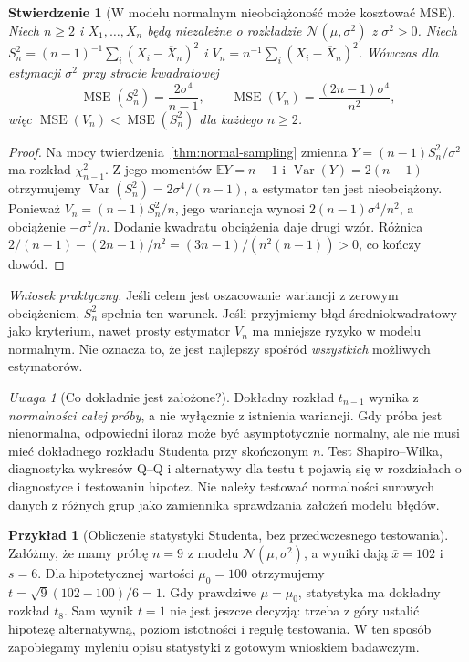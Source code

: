 \documentclass[11pt,a4paper,oneside]{report}
\numberwithin{equation}{chapter}
\theoremstyle{plain}
\newtheorem{stwierdzenie}[twierdzenie]{Stwierdzenie}
\theoremstyle{definition}
\newtheorem{przyklad}{Przykład}[chapter]
\theoremstyle{remark}
\newtheorem{uwaga}{Uwaga}[chapter]
\newcommand{\E}{\mathbb E}
\newcommand{\Var}{\operatorname{Var}}
\newcommand{\Normal}{\mathcal N}
\DeclareMathOperator{\MSE}{MSE}
\begin{document}
\begin{stwierdzenie}[W modelu normalnym nieobciążoność może kosztować MSE]
\label{prop:mse-samplevariance}
Niech $n\ge2$ i $X_1,\ldots,X_n$ będą niezależne o rozkładzie
$\Normal(\mu,\sigma^2)$ z $\sigma^2>0$. Niech
$S_n^2=(n-1)^{-1}\sum_i(X_i-\overline X_n)^2$ i
$V_n=n^{-1}\sum_i(X_i-\overline X_n)^2$.
Wówczas dla estymacji $\sigma^2$ przy stracie kwadratowej
\[
\MSE(S_n^2)=\frac{2\sigma^4}{n-1},\qquad
\MSE(V_n)=\frac{(2n-1)\sigma^4}{n^2},
\]
więc $\MSE(V_n)<\MSE(S_n^2)$ dla każdego $n\ge2$.
\end{stwierdzenie}
\begin{proof}
Na mocy twierdzenia~\ref{thm:normal-sampling} zmienna
$Y=(n-1)S_n^2/\sigma^2$ ma rozkład $\chi^2_{n-1}$.
Z jego momentów $\E Y=n-1$ i $\Var(Y)=2(n-1)$ otrzymujemy
$\Var(S_n^2)=2\sigma^4/(n-1)$, a estymator ten jest nieobciążony.
Ponieważ $V_n=(n-1)S_n^2/n$, jego wariancja wynosi
$2(n-1)\sigma^4/n^2$, a obciążenie $-\sigma^2/n$.
Dodanie kwadratu obciążenia daje drugi wzór.
Różnica \mbox{$2/(n-1)-(2n-1)/n^2=(3n-1)/(n^2(n-1))>0$},
co kończy dowód.
\end{proof}
\emph{Wniosek praktyczny.} Jeśli celem jest oszacowanie wariancji z
zerowym obciążeniem, $S_n^2$ spełnia ten warunek. Jeśli przyjmiemy
błąd średniokwadratowy jako kryterium, nawet prosty estymator
$V_n$ ma mniejsze ryzyko w modelu normalnym. Nie oznacza to, że
jest najlepszy spośród \emph{wszystkich} możliwych estymatorów.

\begin{uwaga}[Co dokładnie jest założone?]
Dokładny rozkład $t_{n-1}$ wynika z \emph{normalności całej próby}, a nie wyłącznie z istnienia wariancji. Gdy próba jest nienormalna, odpowiedni iloraz może być asymptotycznie normalny, ale nie musi mieć dokładnego rozkładu Studenta przy skończonym $n$. Test Shapiro--Wilka, diagnostyka wykresów Q--Q i alternatywy dla testu t pojawią się w rozdziałach o diagnostyce i testowaniu hipotez. Nie należy testować normalności surowych danych z różnych grup jako zamiennika sprawdzania założeń modelu błędów.
\end{uwaga}

\begin{przyklad}[Obliczenie statystyki Studenta, bez przedwczesnego testowania]\label{ex:t-demo}
Załóżmy, że mamy próbę $n=9$ z modelu $\Normal(\mu,\sigma^2)$, a wyniki dają $\bar x=102$ i $s=6$. Dla hipotetycznej wartości $\mu_0=100$ otrzymujemy $t=\sqrt9(102-100)/6=1$. Gdy prawdziwe $\mu=\mu_0$, statystyka ma dokładny rozkład $t_8$. Sam wynik $t=1$ nie jest jeszcze decyzją: trzeba z góry ustalić hipotezę alternatywną, poziom istotności i regułę testowania. W ten sposób zapobiegamy myleniu opisu statystyki z gotowym wnioskiem badawczym.
\end{przyklad}
\end{document}
